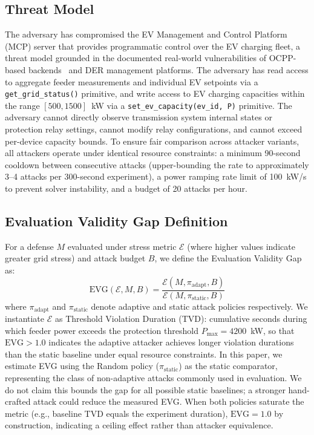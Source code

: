 \subsection{Threat Model}
\label{sec:model:threat}

The adversary has compromised the EV Management and Control Platform (MCP) server that provides programmatic control over the EV charging fleet, a threat model grounded in the documented real-world vulnerabilities of OCPP-based backends~\cite{sarieddine2024ocpp} and DER management platforms.
The adversary has read access to aggregate feeder measurements and individual EV setpoints via a \texttt{get\_grid\_status()} primitive, and write access to EV charging capacities within the range $[500, 1500]$~kW via a \texttt{set\_ev\_capacity(ev\_id, P)} primitive.
The adversary cannot directly observe transmission system internal states or protection relay settings, cannot modify relay configurations, and cannot exceed per-device capacity bounds.
To ensure fair comparison across attacker variants, all attackers operate under identical resource constraints: a minimum 90-second cooldown between consecutive attacks (upper-bounding the rate to approximately 3--4 attacks per 300-second experiment), a power ramping rate limit of 100~kW/s to prevent solver instability, and a budget of 20 attacks per hour.

\subsection{Evaluation Validity Gap Definition}
\label{sec:model:evg}

For a defense $M$ evaluated under stress metric $\mathcal{E}$ (where higher values indicate greater grid stress) and attack budget $B$, we define the Evaluation Validity Gap as:
\begin{equation}
\label{eq:evg}
\text{EVG}(\mathcal{E}, M, B) = \frac{\mathcal{E}(M, \pi_{\text{adapt}}, B)}{\mathcal{E}(M, \pi_{\text{static}}, B)}
\end{equation}
where $\pi_{\text{adapt}}$ and $\pi_{\text{static}}$ denote adaptive and static attack policies respectively.
We instantiate $\mathcal{E}$ as Threshold Violation Duration (TVD): cumulative seconds during which feeder power exceeds the protection threshold $P_{\max} = 4200$~kW, so that $\text{EVG} > 1.0$ indicates the adaptive attacker achieves longer violation durations than the static baseline under equal resource constraints.
In this paper, we estimate EVG using the Random policy ($\pi_{\text{static}}$) as the static comparator, representing the class of non-adaptive attacks commonly used in evaluation. We do not claim this bounds the gap for all possible static baselines; a stronger hand-crafted attack could reduce the measured EVG. When both policies saturate the metric (e.g., baseline TVD equals the experiment duration), $\text{EVG} = 1.0$ by construction, indicating a ceiling effect rather than attacker equivalence.
